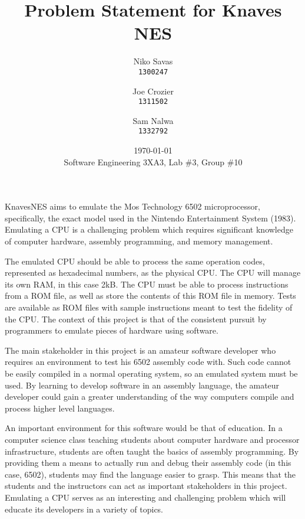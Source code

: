 \documentclass[12pt]{article}
\begin{document}
\title{Problem Statement for Knaves NES}
\date{\today\\
	{\medskip\small Software Engineering 3XA3, Lab \#3, Group \#10}
}
\author{Niko Savas\\
	\texttt{1300247}
	\and
	Joe Crozier\\
	\texttt{1311502}
	\and
	Sam Nalwa\\
	\texttt{1332792}
}
	
\maketitle

KnavesNES aims to emulate the Mos Technology 6502 microprocessor, specifically, the exact model used in the Nintendo Entertainment System (1983). Emulating a CPU is a challenging problem which requires significant knowledge of computer hardware, assembly programming, and memory management.

 The emulated CPU should be able to process the same operation codes, represented as hexadecimal numbers, as the physical CPU. The CPU will manage its own RAM, in this case 2kB. The CPU must be able to process instructions from a ROM file, as well as store the contents of this ROM file in memory. Tests are available as ROM files with sample instructions meant to test the fidelity of the CPU. The context of this project is that of the consistent pursuit by programmers to emulate pieces of hardware using software.

The main stakeholder in this project is an amateur software developer who requires an environment to test his 6502 assembly code with. Such code cannot be easily compiled in a normal operating system, so an emulated system must be used. By learning to develop software in an assembly language, the amateur developer could gain a greater understanding of the way computers compile and process higher level languages.

 An important environment for this software would be that of education. In a computer science class teaching students about computer hardware and processor infrastructure, students are often taught the basics of assembly programming. By providing them a means to actually run and debug their assembly code (in this case, 6502), students may find the language easier to grasp. This means that the students and the instructors can act as important stakeholders in this project. Emulating a CPU serves as an interesting and challenging problem which will educate its developers in a variety of topics.
\end{document}
